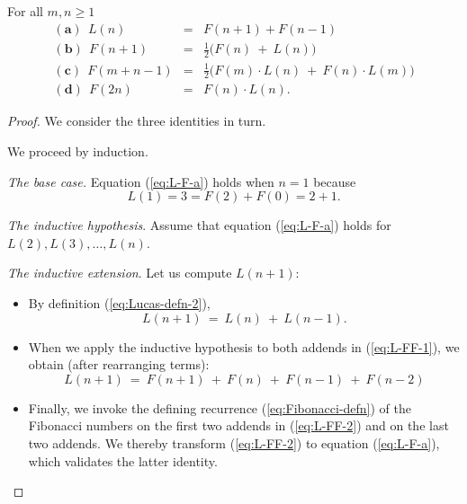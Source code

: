 \begin{prop}
\label{thm:Lucas-n:2Fibs}
For all $m, n \geq 1$
\begin{eqnarray}
\label{eq:L-F-a}
\mathbf{(a) } \ \ 
L(n) & = & F(n+1) + F(n-1) \\
\label{eq:L-F-b}
\mathbf{(b) } \ \
F(n+1) & = & \frac{1}{2} \big(F(n) \ + \ L(n) \big) \\
\label{eq:L-F-c}
\mathbf{(c) } \ \
F(m + n-1) & = & \frac{1}{2} \big( F(m) \cdot L(n) \ + \ F(n) \cdot L(m) \big) \\
\label{eq:L-F-d}
\mathbf{(d) } \ \
F(2n) & = & F(n) \cdot L(n).
\end{eqnarray}
\end{prop}

\begin{proof}
We consider the three identities in turn.

We proceed by induction.

\medskip

\noindent
{\it The base case.}
Equation (\ref{eq:L-F-a}) holds when $n=1$ because
\[ L(1) = 3 = F(2) + F(0) = 2+1. \]

\medskip

\noindent
{\it The inductive hypothesis}.
Assume that equation (\ref{eq:L-F-a}) holds for $L(2), L(3), \ldots,
L(n)$.

\medskip

\noindent
{\it The inductive extension}. 
Let us compute $L(n+1)$:
\begin{itemize}
\item
By definition (\ref{eq:Lucas-defn-2}),
\begin{equation}
\label{eq:L-FF-1}
L(n+1) \ = \ L(n) \ + \ L(n-1).
\end{equation}
\item
When we apply the inductive hypothesis to both addends in
(\ref{eq:L-FF-1}), we obtain (after rearranging terms):
\begin{equation}
\label{eq:L-FF-2}
L(n+1) \ = \  F(n+1) \ + \ F(n) \ + \ F(n-1) \ + \ F(n-2)
\end{equation}
\item
Finally, we invoke the defining recurrence (\ref{eq:Fibonacci-defn})
of the Fibonacci numbers on the first two addends in (\ref{eq:L-FF-2})
and on the last two addends.  We thereby transform (\ref{eq:L-FF-2})
to equation (\ref{eq:L-F-a}), which validates the latter identity.
\end{itemize}

\bigskip


\end{proof}
